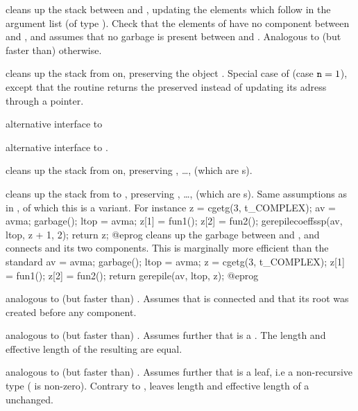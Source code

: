 cleans up the stack between  and , updating
the  elements which follow  in the argument list (of type
). Check that the elements of  have no component between
 and , and assumes that no garbage is present between
 and . Analogous to (but faster than) 
otherwise.

 cleans up the stack  from
 on, preserving the object . Special case of 
(case ${\tt n} = 1$), except that the routine returns the preserved 
instead of updating its adress through a pointer.

 alternative interface
to 

alternative interface to .

 cleans up the stack
from  on, preserving , \dots,  (which are
s).

cleans up the stack from  to , preserving ,
\dots,  (which are s). Same assumptions as in
, of which this is a variant. For instance
\bprog
  z = cgetg(3, t_COMPLEX);
  av = avma; garbage(); ltop = avma;
  z[1] = fun1();
  z[2] = fun2();
  gerepilecoeffssp(av, ltop, z + 1, 2);
  return z;
@eprog\noindent
cleans up the garbage between  and , and connects 
and its two components. This is marginally more efficient than the standard
\bprog
  av = avma; garbage(); ltop = avma;
  z = cgetg(3, t_COMPLEX);
  z[1] = fun1();
  z[2] = fun2(); return gerepile(av, ltop, z);
@eprog\noindent

 analogous to (but faster than)
. Assumes that  is connected and that its root was
created before any component.

 analogous to (but faster than)
. Assumes further that  is a . The
length and effective length of the resulting  are equal.

 analogous to (but faster than)
. Assumes further that  is a leaf, i.e a
non-recursive type ( is non-zero). Contrary to
,  leaves length and effective
length of a  unchanged.

